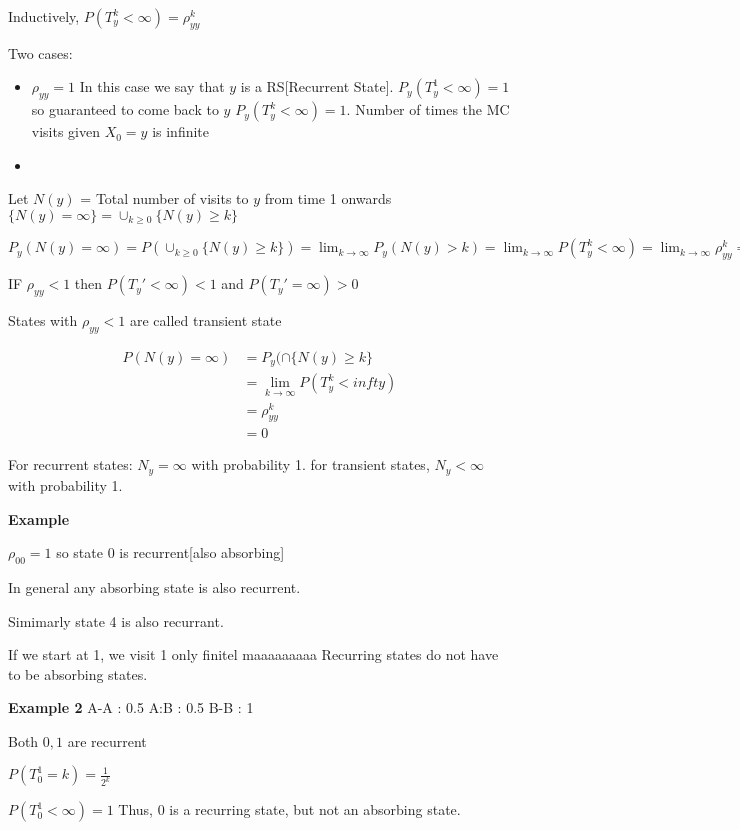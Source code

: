 \documentclass{article}
\begin{document}
Inductively, $P(T_y^k < \infty) = \rho_{yy}^k$

Two cases:

\begin{itemize}
\item $\rho_{yy}=1$ In this case we say that $y$ is a RS[Recurrent State]. $P_y(T_y^1 < \infty) = 1$ so guaranteed to come back to $y$
$P_y(T_y^k < \infty) = 1$. Number of times the MC visits given $X_0=y$ is infinite
\item 
\end{itemize}

Let $N(y)$ = Total number of visits to $y$ from time 1 onwards
$\{N(y) = \infty \} = \cup_{k \geq 0} \{N(y) \geq k \}$  

$P_y(N(y) = \infty)  = P(\cup_{k \geq 0} \{N(y) \geq k \})
= \lim_{k \longrightarrow \infty} P_y(N(y) > k) = \lim_{k \longrightarrow \infty } P(T_y^k < \infty) = \lim_{k \longrightarrow \infty} \rho_{yy}^k = 1$

IF $\rho_{yy} < 1$ then 
$P(T_y' < \infty) < 1$ and $P(T_y' = \infty ) >0 $


States with $\rho_{yy}<1$ are called transient state

\begin{align*}
P(N(y) = \infty) &= P_y(\cap \{ N(y) \geq k\}\\
&= \lim_{k \longrightarrow \infty} P(T_y^k < infty)\\
&= \rho_{yy}^k\\
&= 0
\end{align*}

For recurrent states: $N_y = \infty$ with probability 1.
for transient states, $N_y < \infty$ with probability 1.

\textbf{Example}

$\rho_{00}=1$ so state $0$ is recurrent[also absorbing]

In general any absorbing state is also recurrent.



Simimarly state 4 is also recurrant.

If we start at 1, we visit 1 only finitel maaaaaaaaa
Recurring states do not have to be absorbing states.


\textbf{Example 2}
A-A : 0.5
A:B : 0.5
B-B : 1

Both $0,1$ are recurrent

$P(T_0^1 =k) = \frac{1}{2^k}$

$P(T_0^1 < \infty) = 1$ Thus, $0$ is a recurring state, but not an absorbing state.
\end{document}
